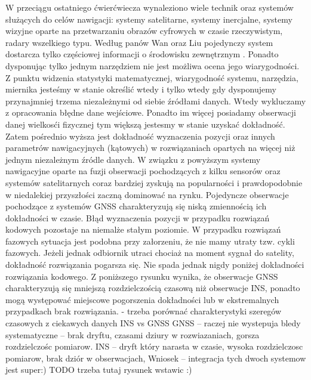 W przeciągu ostatniego ćwierćwiecza wynaleziono wiele technik oraz systemów służących do celów nawigacji: systemy satelitarne, systemy inercjalne,
systemy wizyjne oparte na przetwarzaniu obrazów cyfrowych w czasie rzeczywistym, radary wszelkiego typu.
Według panów Wan oraz Liu pojedynczy system dostarcza tylko częściowej informacji o środowisku zewnętrznym \cite[][strona 770]{CCTA_769_775}.
Ponadto dysponując tylko jednym narzędziem nie jest możliwa ocena jego wiarygodności. Z punktu widzenia statystyki matematycznej,
wiarygodność systemu, narzędzia, miernika jesteśmy w stanie określić wtedy i tylko wtedy gdy dysponujemy przynajmniej trzema niezależnymi od siebie źródłami danych.
Wtedy wykluczamy z opracowania błędne dane wejściowe. Ponadto im więcej posiadamy obserwacji danej wielkosći fizycznej tym większą jestesmy w stanie uzyskać dokładność.
Zatem pośrednio wyższa jest dokładność wyznaczenia pozycji oraz innych parametrów nawigacyjnych (kątowych)
w rozwiązaniach opartych na więcej niż jednym niezależnym źródle danych. W związku z powyższym systemy nawigacyjne oparte na fuzji obserwacji
pochodzących z kilku sensorów oraz systemów satelitarnych coraz bardziej zyskują na popularności \cite[][strona 770]{CCTA_769_775}
i prawdopodobnie w niedalekiej przyszłości zaczną dominować na rynku.
Pojedyncze obserwacje pochodzące z systemów GNSS charakteryzują się niską zmiennością ich dokładności w czasie.
Błąd wyznaczenia pozycji w przypadku rozwiązań kodowych pozostaje na niemalże stałym poziomie. 
W przypadku rozwiązań fazowych sytuacja jest podobna przy załorzeniu, że nie mamy utraty tzw. cykli fazowych.
Jeżeli jednak odbiornik utraci chociaż na moment sygnał do satelity, dokładność rozwiązania pogarsza się.
Nie spada jednak nigdy poniżej dokładności rozwiązania kodowego. Z poniższego rysunku wynika,
że obserwacje GNSS charakteryzują się mniejszą rozdzielczością czasową niż obserwacje INS,
ponadto mogą występować miejscowe pogorszenia dokładności lub w ekstremalnych przypadkach brak rozwiązania.
- trzeba porównać charakterystyki szeregów czasowych z ciekawych danych INS vs GNSS
GNSS – raczej nie wystepuja bledy systematyczne – brak dryftu, czasami dziury w rozwiazaniach, gorsza rozdzielczośc pomiarow. 
INS – dryft który narasta w czasie, wysoka rozdzielczosc pomiarow, brak dziór w obserwacjach,
Wniosek – integracja tych dwoch systemow jest super:)
TODO trzeba tutaj rysunek wstawic :)
